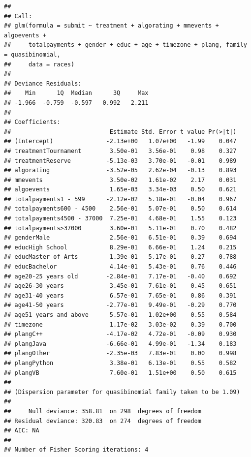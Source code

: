 \documentclass[12pt,]{article}
\theoremstyle{plain} %
\begin{document}
\begin{verbatim}
## 
## Call:
## glm(formula = submit ~ treatment + algorating + mmevents + algoevents + 
##     totalpayments + gender + educ + age + timezone + plang, family = quasibinomial, 
##     data = races)
## 
## Deviance Residuals: 
##    Min      1Q  Median      3Q     Max  
## -1.966  -0.759  -0.597   0.992   2.211  
## 
## Coefficients:
##                            Estimate Std. Error t value Pr(>|t|)
## (Intercept)               -2.13e+00   1.07e+00   -1.99    0.047
## treatmentTournament        3.50e-01   3.56e-01    0.98    0.327
## treatmentReserve          -5.13e-03   3.70e-01   -0.01    0.989
## algorating                -3.52e-05   2.62e-04   -0.13    0.893
## mmevents                   3.50e-02   1.61e-02    2.17    0.031
## algoevents                 1.65e-03   3.34e-03    0.50    0.621
## totalpayments1 - 599      -2.12e-02   5.18e-01   -0.04    0.967
## totalpayments600 - 4500    2.56e-01   5.07e-01    0.50    0.614
## totalpayments4500 - 37000  7.25e-01   4.68e-01    1.55    0.123
## totalpayments>37000        3.60e-01   5.11e-01    0.70    0.482
## genderMale                 2.56e-01   6.51e-01    0.39    0.694
## educHigh School            8.29e-01   6.66e-01    1.24    0.215
## educMaster of Arts         1.39e-01   5.17e-01    0.27    0.788
## educBachelor               4.14e-01   5.43e-01    0.76    0.446
## age20-25 years old        -2.84e-01   7.17e-01   -0.40    0.692
## age26-30 years             3.45e-01   7.61e-01    0.45    0.651
## age31-40 years             6.57e-01   7.65e-01    0.86    0.391
## age41-50 years            -2.77e-01   9.49e-01   -0.29    0.770
## age51 years and above      5.57e-01   1.02e+00    0.55    0.584
## timezone                   1.17e-02   3.03e-02    0.39    0.700
## plangC++                  -4.17e-02   4.72e-01   -0.09    0.930
## plangJava                 -6.66e-01   4.99e-01   -1.34    0.183
## plangOther                -2.35e-03   7.83e-01    0.00    0.998
## plangPython                3.38e-01   6.13e-01    0.55    0.582
## plangVB                    7.60e-01   1.51e+00    0.50    0.615
## 
## (Dispersion parameter for quasibinomial family taken to be 1.09)
## 
##     Null deviance: 358.81  on 298  degrees of freedom
## Residual deviance: 320.83  on 274  degrees of freedom
## AIC: NA
## 
## Number of Fisher Scoring iterations: 4
\end{verbatim}
\end{document}
